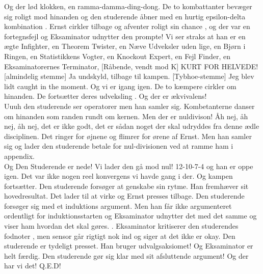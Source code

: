 \documentclass[a4paper,11pt]{article}
\begin{document}
\begin{sketch}
Og der lød klokken, en ramma-damma-ding-dong. De to kombattanter bevæger sig roligt mod hinanden  og den studerende åbner med en hurtig epsilon-delta kombination . Ernst cirkler tilbage og afventer roligt sin chance , og der var en fortegnsfejl  og Eksaminator udnytter den prompte!  Vi ser straks at han er en ægte Infighter, en Theorem Twister, en Næve Udveksler uden lige, en Bjørn i Ringen,  en Statistikkens Vogter, en Knockout Expert, en Fejl Finder, en Eksaminatorernes Terminator,
[Råbende, vendt mod K] KURT FOR HELVEDE!
[almindelig stemme] Ja undskyld, tilbage til kampen.
[Tybhoe-stemme] Jeg blev lidt caught in the moment. %
Og vi er igang igen. De to kæmpere cirkler om hinanden.  De fortsætter deres udveksling . Og der er ækvivalens!  \\
Uuuh den studerende ser operatorer  men han samler sig.
Kombetanterne danser om hinanden som randen rundt om kernen. Men der er nuldivison!   Åh nej, åh nej, åh nej, det er ikke godt, det er sådan noget der skal udryddes fra denne ædle disciplinen. Det ringer for øjnene og flimrer for ørene af Ernst. Men han samler sig og lader den studerende betale for nul-divisionen ved at ramme ham i appendix.  \\
Og Den Studerende er nede! Vi lader den gå mod nul! 12-10-7-4 og han er oppe igen. Det var ikke nogen reel konvergens vi havde gang i der.  Og kampen fortsætter. Den studerende forsøger at genskabe sin rytme. Han fremhæver sit hovedresultat. \act{} Det lader til at virke og Ernst presses tilbage. Den studerende forsøger sig med et induktions argument. Men han får ikke argumenteret ordentligt for induktionsstarten  og Eksaminator udnytter det med det samme og viser ham hvordan det skal gøres. . Eksaminator kritiserer den studerendes fodnoter , men sensor går rigtigt nok ind og siger at det ikke er okay.
Den studerende er tydeligt presset. Han bruger udvalgsaksiomet!  Og Eksaminator er helt færdig. Den studerende gør sig klar med sit afsluttende argument! Og der har vi det! Q.E.D!  

\end{sketch}
\end{document}
